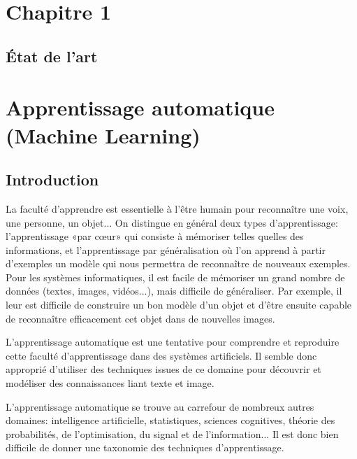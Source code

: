 \documentclass[12pt]{article}
\begin{document}
\thispagestyle{empty}
\cleardoublepage


\tableofcontents
\thispagestyle{empty}
\newpage


\listoffigures
{}
\cleardoublepage

\listoftables
{}
\cleardoublepage

\setcounter{page}{1}
\section*{\Huge{Chapitre 1}}
\subsection*{\huge{\' Etat de l'art}}
\newpage
{}
\section{Apprentissage automatique (Machine Learning)}
\subsection{Introduction}
La faculté d'apprendre est essentielle à l'être humain pour reconnaître une voix, une personne, un objet... On distingue en général deux types d'apprentissage: l'apprentissage «par cœur» qui consiste à mémoriser telles quelles des informations, et l'apprentissage par généralisation où l'on apprend à partir d'exemples un modèle qui nous permettra de reconnaître de nouveaux exemples. Pour les systèmes informatiques, il est facile de mémoriser un grand nombre de données (textes, images, vidéos...), mais difficile de généraliser. Par exemple, il leur est difficile de construire un bon modèle d'un objet et d'être ensuite capable de reconnaître efficacement cet objet dans de nouvelles images.

L'apprentissage automatique est une tentative pour comprendre et reproduire cette faculté d'apprentissage dans des systèmes artificiels. Il semble donc approprié d'utiliser des techniques issues de ce domaine pour découvrir et modéliser des connaissances liant texte et image.

L'apprentissage automatique se trouve au carrefour de nombreux autres domaines: intelligence artificielle, statistiques, sciences cognitives, théorie des probabilités, de l'optimisation, du signal et de l'information... Il est donc bien difficile de donner une taxonomie des techniques d'apprentissage.
\end{document}
